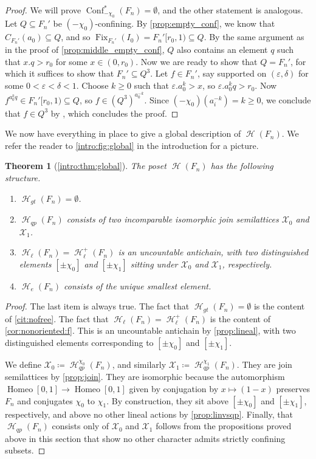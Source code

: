 \documentclass[reqno,12pt]{amsart}\setcounter{tocdepth}{1}
\newtheorem{theorem}{Theorem}[section]
\theoremstyle{definition}
\DeclareMathOperator{\Homeo}{Homeo}
\DeclareMathOperator{\Fix}{Fix}
\DeclareMathOperator{\Hyp}{\mathcal{H}}
\DeclareMathOperator{\Conf}{Conf}
\newcommand{\X}{\mathcal{X}}
\numberwithin{equation}{section}
\begin{document}
\begin{proof}
We will prove $\Conf^\ast_{-\chi_0}(F_n)=\emptyset$, and the other statement is analogous. Let $Q\subseteq F_n'$ be $(-\chi_0)$-confining. By \cref{prop:empty_conf}, we know that $C_{F_n'}(a_0) \subseteq Q$, and so $\Fix_{F_n'}(I_0)=F_n'[r_0,1)\subseteq Q$. By the same argument as in the proof of \cref{prop:middle_empty_conf}, $Q$ also contains an element $q$ such that $x.q>r_0$ for some $x\in (0,r_0)$. Now we are ready to show that $Q=F_n'$, for which it suffices to show that $F_n' \subseteq Q^3$. Let $f\in F_n'$, say supported on $(\varepsilon,\delta)$ for some $0<\varepsilon<\delta<1$. Choose $k\ge 0$ such that $\varepsilon.a_0^k>x$, so $\varepsilon.a_0^k q > r_0$. Now $f^{a_0^k q}\in F_n'[r_0,1)\subseteq Q$, so $f\in (Q^3)^{a_0^{-k}}$. Since $(-\chi_0)(a_i^{-k})=k\ge 0$, we conclude that $f\in Q^3$ by \StayInConf, which concludes the proof.
\end{proof}

We now have everything in place to give a global description of $\Hyp(F_n)$. We refer the reader to \cref{intro:fig:global} in the introduction for a picture.

\begin{theorem}[\cref{intro:thm:global}]\label{thm:global}
The poset $\Hyp(F_n)$ has the following structure.
\begin{enumerate}
   \item $\Hyp_{gt}(F_n) = \emptyset$.
   \item $\Hyp_{qp}(F_n)$ consists of two incomparable isomorphic join semilattices $\X_0$ and $\X_1$.
   \item $\Hyp_{\ell}(F_n) = \Hyp_{\ell}^+(F_n)$ is an uncountable antichain, with two distinguished elements $[\pm\chi_0]$ and $[\pm\chi_1]$ sitting under $\X_0$ and $\X_1$, respectively.
   \item $\Hyp_e(F_n)$ consists of the unique smallest element.
\end{enumerate}
\end{theorem}

\begin{proof}
The last item is always true. The fact that $\Hyp_{gt}(F_n) = \emptyset$ is the content of \cref{cit:nofree}. The fact that $\Hyp_{\ell}(F_n) = \Hyp_{\ell}^+(F_n)$ is the content of \cref{cor:nonoriented:f}. This is an uncountable antichain by \cref{prop:lineal}, with two distinguished elements corresponding to $[\pm\chi_0]$ and $[\pm\chi_1]$.

We define $\X_0 \coloneqq \Hyp_{qp}^{\chi_0}(F_n)$, and similarly $\X_1 \coloneqq \Hyp_{qp}^{\chi_1}(F_n)$. They are join semilattices by \cref{prop:join}. They are isomorphic because the automorphism $\Homeo[0, 1] \to \Homeo[0, 1]$ given by conjugation by $x \mapsto (1 - x)$ preserves $F_n$ and conjugates $\chi_0$ to $\chi_1$. By construction, they sit above $[\pm\chi_0]$ and $[\pm\chi_1]$, respectively, and above no other lineal actions by \cref{prop:linvsqp}. Finally, that $\Hyp_{qp}(F_n)$ consists only of $\X_0$ and $\X_1$ follows from the propositions proved above in this section that show no other character admits strictly confining subsets.
\end{proof}
\end{document}
